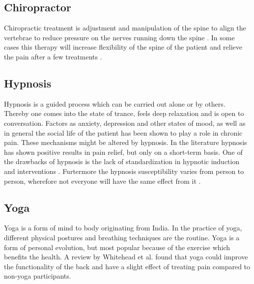 \subsection{Chiropractor}
Chiropractic treatment is adjustment and manipulation of the spine to align the vertebrae to reduce pressure on the nerves running down the spine \cite{Gerald2013}. In some cases this therapy will increase flexibility of the spine of the patient and relieve the pain after a few treatments \cite{Peterson2012}.

\subsection{Hypnosis}
Hypnosis is a guided process which can be carried out alone or by others. Thereby one comes into the state of trance, feels deep relaxation and is open to conversation. \cite{Gerald2013} 
Factors as anxiety, depression and other states of mood, as well as in general the social life of the patient has been shown to play a role in chronic pain. These mechanisms might be altered by hypnosis.
In the literature hypnosis has shown positive results in pain relief, but only on a short-term basis. \cite{Dhanani2011}
One of the drawbacks of hypnosis is the lack of standardization in hypnotic induction and interventions \cite{Alkins2010}. Furtermore the hypnosis susceptibility varies from person to person, wherefore not everyone will have the same effect from it \cite{Spiegel2013}.

\subsection{Yoga}
Yoga is a form of mind to body originating from India. In the practice of yoga, different physical postures and breathing techniques are the routine. 
Yoga is a form of personal evolution, but most popular because of the exercise which benefits the health. \cite{Whitehead2017}
A review by Whitehead et al. \cite{Whitehead2017} found that yoga could improve the functionality of the back and have a slight effect of treating pain compared to non-yoga participants. 

